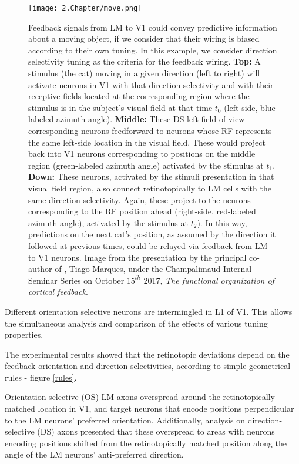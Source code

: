 \begin{figure}[h]
\center
\texttt{[image: 2.Chapter/move.png]}
\caption{Feedback signals from LM to V1 could convey predictive information about a moving object, if we consider that their wiring is biased according to their own tuning. In this example, we consider direction selectivity tuning as the criteria for the feedback wiring. \newline \textbf{Top:} A stimulus (the cat) moving in a given direction (left to right) will activate neurons in V1 with that direction selectivity and with their receptive fields located at the corresponding region where the stimulus is in the subject's visual field at that time $t_0$ (left-side, blue labeled azimuth angle). \newline \textbf{Middle:} These DS left field-of-view corresponding neurons feedforward to neurons whose RF represents the same left-side location in the visual field. These would project back into V1 neurons corresponding to positions on the middle region (green-labeled azimuth angle) activated by the stimulus at $t_1$. \newline \textbf{Down: } These neurons, activated by the stimuli presentation in that visual field region, also connect retinotopically to LM cells with the same direction selectivity. Again, these project to the neurons corresponding to the RF position ahead (right-side, red-labeled azimuth angle), activated by the stimulus at $t_2$). \newline In this way, predictions on the next cat's position, as assumed by the direction it followed at previous times, could be relayed via feedback from LM to V1 neurons.
\newline \newline \tiny{Image from the presentation by the principal co-author of \cite{Marques2018}, Tiago Marques, under the Champalimaud Internal Seminar Series on October $15^{th}$ 2017, \textit{The functional organization of cortical feedback}.}\label{cat}} 
\label{move}
\end{figure}

Different orientation selective neurons are intermingled in L1 of V1. This allows the simultaneous analysis and comparison of the effects of various tuning properties.

The experimental results showed that the retinotopic deviations depend on the feedback orientation and direction selectivities, according to simple geometrical rules - figure \ref{rules}.

Orientation-selective (OS) LM axons overspread around the retinotopically matched location in V1, and target neurons that encode positions perpendicular to the LM neurons' preferred orientation. Additionally, analysis on direction-selective (DS) axons presented that these overspread to areas with neurons encoding positions shifted from the retinotopically matched position along the angle of the LM neurons' anti-preferred direction. 

